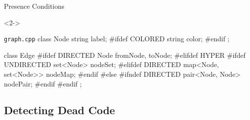 \begin{frame}[b,fragile]{\myframetitle}
\begin{fancycolumns}[t,columns=3,widths={40,23,37},animation=none]
{\begin{exampletight}{Presence Conditions}
\begin{flushright}
				\end{flushright}
			\end{exampletight}
		}
	\nextcolumn
		\begin{uncoverenv}<2->
			\begin{cpptight}[basicstyle=\small]{\texttt{graph.cpp}}
class Node {
	string label;
#ifdef COLORED
	string color;
#endif
};

class Edge {
#ifdef DIRECTED
	Node fromNode, toNode;
#elifdef HYPER
#ifdef UNDIRECTED
	set<Node> nodeSet;
#elifdef DIRECTED
	map<Node, set<Node>> nodeMap;
#endif
#else
#ifndef DIRECTED
	pair<Node, Node> nodePair;
#endif
#endif
};
			\end{cpptight}
		\end{uncoverenv}
	\end{fancycolumns}
\end{frame}

\subsection{Detecting Dead Code}

